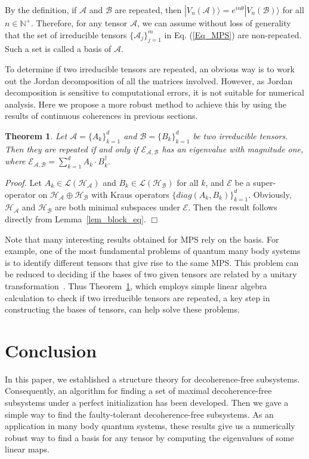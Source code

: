 \documentclass[journal]{IEEEtran}
\def\h{\ensuremath{\mathcal{H}}}
\def\l{\ensuremath{\mathcal{L}}}
\def\a{\ensuremath{\mathcal{A}}}
\def\b{\ensuremath{\mathcal{B}}}
\def\e{\ensuremath{\mathcal{E}}}
\def\l{\ensuremath{\mathcal{L}}}
\def\l{\mathcal{L}}
\newtheorem{theorem}{Theorem}
\begin{document}
By the definition, if $\a$ and $\b$ are repeated, then $|V_n(\a)\rangle=e^{in\theta}|V_n(\b)\rangle$ for all $n\in \mathbb{N^+}$. Therefore, for any tensor $\a$, we can assume without loss of generality that the set of irreducible tensors $\{\a_{j}\}_{j=1}^{m}$ in Eq. (\ref{Eq_MPS}) are non-repeated. Such a set is called a basis of $\a$. 

To determine if two irreducible tensors are repeated, an obvious way is to work out the Jordan decomposition of all the matrices involved. However, as Jordan decomposition is sensitive to computational errors, it is not suitable for numerical analysis. Here we propose a more robust method to achieve this by using the results of continuous coherences in previous sections. 
\begin{theorem}\label{thm:repeated}
  Let $\a=\{A_{k}\}_{k=1}^{d}$ and $\b=\{B_{k}\}_{k=1}^{d}$ be two irreducible tensors. Then they are repeated if and only if $\e_{\a,\b}$ has an eigenvalue with magnitude one, where $\e_{\a,\b}=\sum_{k=1}^d A_{k}\cdot B_{k}^\dagger.$
\end{theorem}
{\it Proof.} Let $A_k\in \l(\h_\a)$ and $B_k\in \l(\h_\b)$ for all $k$, and $\e$ be a super-operator on $\h_\a\oplus \h_\b$ with Kraus operators $\{diag(A_k,B_k)\}_{k=1}^d$. Obviously, $\h_\a$ and $\h_\b$ are both minimal subspaces under $\e$. Then the result follows directly from Lemma~\ref{lem_block_eq}. 
\hfill $\Box$


Note that many interesting results obtained for MPS rely on the basis. For example, one of the most fundamental problems of quantum many body systems is to identify different tensors that give rise to the same MPS.
This problem can be reduced to deciding if the bases of two given tensors are related by a unitary transformation~\cite{cuevas2017irreducible}. 
Thus Theorem~\ref{thm:repeated}, which employs simple linear algebra calculation to check if two irreducible tensors are repeated, a key step in constructing the bases of 
tensors, can help solve these problems.

\section{Conclusion}
In this paper, we established a structure theory for decoherence-free subsystems. Consequently, an algorithm for finding a set of maximal decoherence-free subsystems under a perfect initialization has been developed. Then we gave a simple way to find the faulty-tolerant decoherence-free subsystems. As an application in many body quantum systems, these results give us a numerically robust way to find a basis for any tensor by computing the eigenvalues of some linear maps. 
\end{document}
